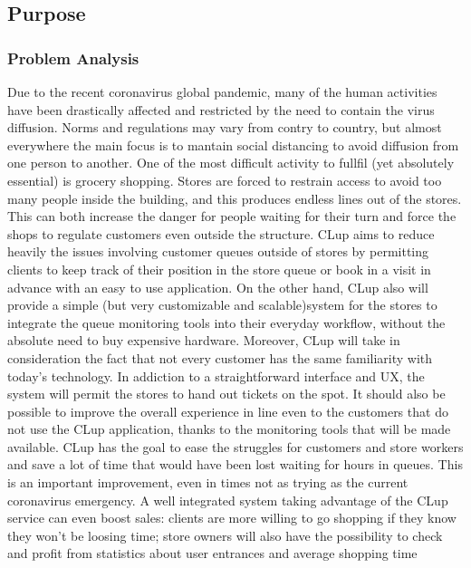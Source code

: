 \subsection{Purpose}

\subsubsection{Problem Analysis}

Due to the recent coronavirus global pandemic, many of the human activities have been drastically affected and restricted by the need to contain the virus diffusion. Norms and regulations may vary from contry to country, but almost everywhere the main focus is to mantain social distancing to avoid diffusion from one person to another.
One of the most difficult activity to fullfil (yet absolutely essential) is grocery shopping.
Stores are forced to restrain access to avoid too many people inside the building, and this produces endless lines out of the stores. This can both increase the danger for people waiting for their turn and force the shops to regulate customers even outside the structure.
CLup aims to reduce heavily the issues involving customer queues outside of stores by permitting clients to keep track of their position in the store queue or book in a visit in advance with an easy to use application.
On the other hand, CLup also will provide a simple (but very customizable and scalable)system for the stores to integrate the queue monitoring tools into their everyday workflow, without the absolute need to buy expensive hardware.
Moreover, CLup will take in consideration the fact that not every customer has the same familiarity with today’s technology. In addiction to a straightforward interface and UX, the system will permit the stores to hand out tickets on the spot. It should also be possible to improve the overall experience in line even to the customers that do not use the CLup application, thanks to the monitoring tools that will be made available.
CLup has the goal to ease the struggles for customers and store workers and save a lot of time that would have been lost waiting for hours in queues. This is an important improvement, even in times not as trying as the current coronavirus emergency. A well integrated system taking advantage of the CLup service can even boost sales: clients are more willing to go shopping if they know they won’t be loosing time; store owners will also have the possibility to check and profit from statistics about user entrances and average shopping time
\medskip

